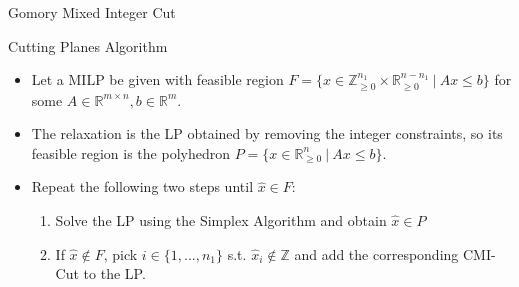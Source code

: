 \begin{frame}{Gomory Mixed Integer Cut}



\end{frame}

\begin{frame}{Cutting Planes Algorithm}
\begin{itemize}
\item Let a MILP be given with feasible region $F = \{x \in \mathbb{Z}_{\geq 0}^{n_1} \times \mathbb{R}_{\geq 0}^{n-n_1} \:\vert\: Ax \leq b \}$ for some $A \in \mathbb{R}^{m \times n}, b \in \mathbb{R}^m$.
\item The relaxation is the LP obtained by removing the integer constraints, so its feasible region is the polyhedron $P = \{x \in \mathbb{R}_{\geq 0}^{n} \:\vert\: Ax \leq b \}$.
\item Repeat the following two steps until $\hat{x} \in F$:
\begin{enumerate}
\item Solve the LP using the Simplex Algorithm and obtain $\hat{x} \in P$
\item If $\hat{x} \notin F$, pick $i \in \{1,...,n_1\}$ s.t. $\hat{x}_i \notin \mathbb{Z}$ and add the corresponding CMI-Cut to the LP.
\end{enumerate}
\end{itemize}
\end{frame}

